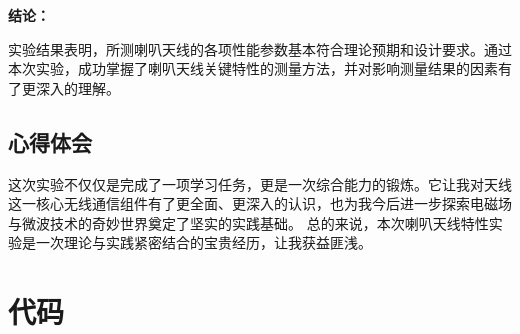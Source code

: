 \documentclass[12pt,a4paper,UTF8]{article}
\begin{document}
\textbf{结论：}

实验结果表明，所测喇叭天线的各项性能参数基本符合理论预期和设计要求。通过本次实验，成功掌握了喇叭天线关键特性的测量方法，并对影响测量结果的因素有了更深入的理解。

\subsection{心得体会}

这次实验不仅仅是完成了一项学习任务，更是一次综合能力的锻炼。它让我对天线这一核心无线通信组件有了更全面、更深入的认识，也为我今后进一步探索电磁场与微波技术的奇妙世界奠定了坚实的实践基础。
总的来说，本次喇叭天线特性实验是一次理论与实践紧密结合的宝贵经历，让我获益匪浅。

\section{代码}
\end{document}
